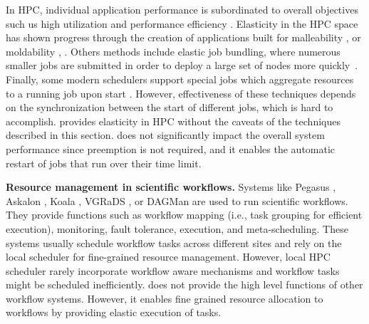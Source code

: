 In HPC, individual application performance is subordinated to
overall objectives such us high utilization and
performance efficiency \cite{efficient_scheduling}. 
Elasticity in the HPC space has
shown progress through the creation of applications built for malleability 
\cite{rodrigo2015a2l2}, \cite{mohamed2008koala} or
moldability \cite{feitelson1997theory}, \cite{klein2011rms}.
 Others methods include elastic job bundling, where numerous smaller jobs are submitted in order
to deploy a large set of nodes more quickly~\cite{elastic_job_bundling}.
Finally, some modern schedulers support special jobs which
aggregate resources to a running job upon start \cite{zhou2013exploring}.
However, effectiveness of these techniques depends on the
synchronization between the start of different jobs,
which is hard to accomplish. \systemname provides elasticity in HPC without the caveats of the techniques described
in this section. \systemname does not  significantly impact  the overall system
performance since preemption is not required, and
it enables the automatic restart of jobs that run over their time limit.

\noindent \textbf{Resource management in scientific workflows.}
Systems like Pegasus \cite{deelman2004pegasus}, Askalon \cite{Askalon},
Koala \cite{KOALA}, VGRaDS \cite{ramakrishnan2009vgrads}, 
or DAGMan \cite{couvares2007workflow}
are used to run scientific workflows.
They provide functions such as workflow
mapping (i.e., task grouping for efficient execution), monitoring,
fault tolerance, execution, and meta-scheduling.
These systems usually schedule workflow tasks across different
sites and rely on the local scheduler for
fine-grained resource management.
However,
local HPC scheduler rarely incorporate workflow aware 
mechanisms \cite{rodrigo2017enabling} and workflow tasks might be scheduled
inefficiently.%
\systemname does not provide the high level functions of other workflow
systems.
However, it enables fine grained resource allocation to workflows
by providing elastic execution of tasks.

